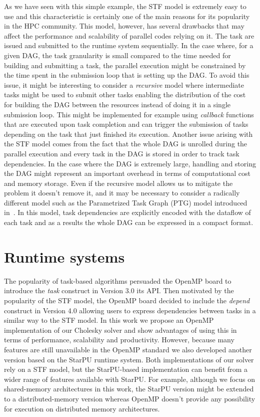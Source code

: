 \documentclass{article}
\begin{document}
As we have seen with this simple example, the STF model is extremely
easy to use and this characteristic is certainly one of the main
reasons for its popularity in the HPC community. This model, however,
has several drawbacks that may affect the performance and scalability
of parallel codes relying on it. The task are issued and submitted to
the runtime system sequentially. In the case where, for a given DAG,
the task granularity is small compared to the time needed for building
and submitting a task, the parallel execution might be constrained
by the time spent in the submission loop that is setting up the
DAG. To avoid this issue, it might be interesting to consider a
\textit{recursive} model where intermediate tasks might be used to
submit other tasks enabling the distribution of the cost for building
the DAG between the resources instead of doing it in a single
submission loop. This might be implemented for example using
\textit{callback} functions that are executed upon task completion and
can trigger the submission of tasks depending on the task that just
finished its execution. Another issue arising with the STF model comes
from the fact that the whole DAG is unrolled during the parallel
execution and every task in the DAG is stored in order to track task
dependencies. In the case where the DAG is extremely large, handling
and storing the DAG might represent an important overhead in terms of
computational cost and memory storage. Even if the recursive model
allows us to mitigate the problem it doesn't remove it, and it may be
necessary to consider a radically different model such as the
Parametrized Task Graph (PTG) model introduced in~\cite{c.l:95}. In
this model, task dependencies are explicitly encoded with the dataflow
of each task and as a results the whole DAG can be expressed in a
compact format.


\section{Runtime systems}\label{sec:runtime}
\setcounter{equation}{0}
\setcounter{table}{0}
\setcounter{figure}{0}

The popularity of task-based algorithms persuaded the OpenMP board to
introduce the \textit{task} construct in Version 3.0 its API. Then
motivated by the popularity of the STF model, the OpenMP board decided
to include the \textit{depend} construct in Version 4.0 allowing users
to express dependencies between tasks in a similar way to the STF
model. In this work we propose an OpenMP implementation of our
Cholesky solver and show advantages of using this in terms of
performance, scalability and productivity. However, because many
features are still unavailable in the OpenMP standard we also
developed another version based on the StarPU runtime system. Both
implementations of our solver rely on a STF model, but the
StarPU-based implementation can benefit from a wider range of features
available with StarPU. For example, although we focus on shared-memory
architectures in this work, the StarPU version might be extended to a
distributed-memory version whereas OpenMP doesn't provide any
possibility for execution on distributed memory architectures.
\end{document}
